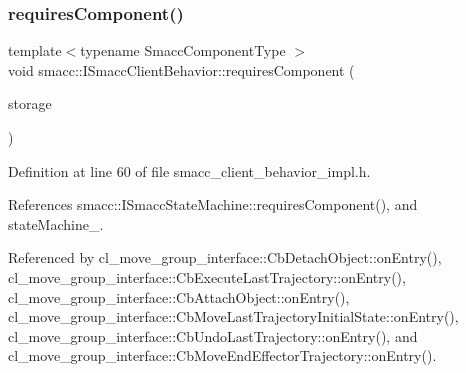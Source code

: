 \mbox{\label{classsmacc_1_1ISmaccClientBehavior_a19c6d658c8e809bb93bfdc9b639a3ac3}} 
\subsubsection{\texorpdfstring{requires\+Component()}{requiresComponent()}}
{\footnotesize\ttfamily template$<$typename Smacc\+Component\+Type $>$ \\
void smacc\+::\+I\+Smacc\+Client\+Behavior\+::requires\+Component (\begin{DoxyParamCaption}\item[{Smacc\+Component\+Type $\ast$\&}]{storage }\end{DoxyParamCaption})}



Definition at line 60 of file smacc\+\_\+client\+\_\+behavior\+\_\+impl.\+h.



References smacc\+::\+I\+Smacc\+State\+Machine\+::requires\+Component(), and state\+Machine\+\_\+.



Referenced by cl\+\_\+move\+\_\+group\+\_\+interface\+::\+Cb\+Detach\+Object\+::on\+Entry(), cl\+\_\+move\+\_\+group\+\_\+interface\+::\+Cb\+Execute\+Last\+Trajectory\+::on\+Entry(), cl\+\_\+move\+\_\+group\+\_\+interface\+::\+Cb\+Attach\+Object\+::on\+Entry(), cl\+\_\+move\+\_\+group\+\_\+interface\+::\+Cb\+Move\+Last\+Trajectory\+Initial\+State\+::on\+Entry(), cl\+\_\+move\+\_\+group\+\_\+interface\+::\+Cb\+Undo\+Last\+Trajectory\+::on\+Entry(), and cl\+\_\+move\+\_\+group\+\_\+interface\+::\+Cb\+Move\+End\+Effector\+Trajectory\+::on\+Entry().


